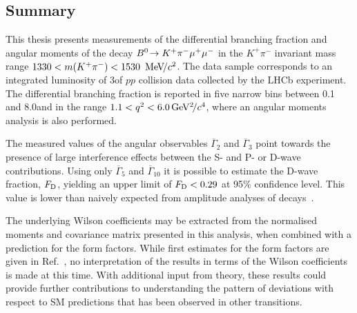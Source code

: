 \subsection{Summary}

This thesis presents measurements of the differential branching fraction and angular moments of the decay ${B}^0\!\rightarrow K^{+}\pi^{-}\mu^{+}\mu^{-}$ in the $K^{+}\pi^{-}$ invariant mass range \mbox{$1330<m({{K}^+}{{\pi}^-})<1530~\mathrm{\,Me\kern -0.1em V\!/}c^{2}$}.  The data sample corresponds to an integrated luminosity of 3\invfb of $pp$ collision data collected by the LHCb experiment.  The differential branching fraction is reported in five narrow \qsq bins between 0.1 and 8.0\gevgevcccc and in the range $1.1<{q^2}<6.0{\mathrm{\,Ge\kern -0.1em V^2\!/}c^4}$, where an angular moments analysis is also performed.

The measured values of the angular observables $\overline{\Gamma}_{2}$ and $\overline{\Gamma}_{3}$ point towards the presence of large interference effects between the S- and P- or D-wave contributions. Using only $\overline{\Gamma}_{5}$ and $\overline{\Gamma}_{10}$ it is possible to estimate the D-wave fraction, $F_{\rm D}$,  yielding an upper limit of $F_{\rm D}<0.29$ at 95\% confidence level. This value is lower than naively expected from amplitude analyses of \BdToJPsiKpi decays~\cite{belle-z-paper}.

The underlying Wilson coefficients may be extracted from the normalised moments and covariance matrix presented in this analysis, when combined with a prediction for the form factors. While first estimates for the form factors are given in Ref.~\cite{lu-wang}, no interpretation of the results in terms of the Wilson coefficients is made at this time. With additional input from theory, these results could provide further contributions to understanding the pattern of deviations with respect to SM predictions that has been observed in other \btosmm transitions.